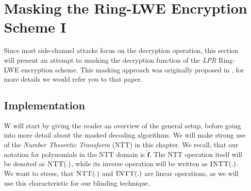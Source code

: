 %
%

\chapter{Masking the Ring-LWE Encryption Scheme I}
Since most side-channel attacks focus on the decryption operation, this section will present an attempt to masking the decryption function of the \textit{LPR} Ring-LWE encryption scheme. This masking approach was originally proposed in \cite{maskedRing}, for more details we would refer you to that paper.

\section{Implementation}
W will start by giving the reader an overview of the general setup, before going into more detail about the masked decoding algorithms. We will make strong use of the \textit{Number Theoretic Transform} (NTT) in this chapter. We recall, that our notation for polynomials in the NTT domain is \(\tilde{\textbf{f}}\). The NTT operation itself will be denoted as \(\textsc{NTT}(.)\), while its inverse operation will be written as \(\textsc{INTT}(.)\). We want to stress, that \(\textsc{NTT}(.)\) and \(\textsc{INTT}(.)\) are linear operations, as we will use this characteristic for our blinding technique.

